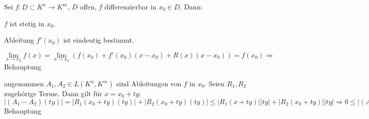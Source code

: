 	\begin{satz}\label{satz:eindeutig_x}
		Sei $f:D\subset K^n \to K^m$, $D$ offen, $f$ differenzierbar in $x_0\in D$. Dann:
		\begin{compactitem}
			\item $f$ ist stetig in $x_0$.
			\item Ableitung $f'(x_0)$ ist eindeutig bestimmt.
		\end{compactitem}
	\end{satz}
	\begin{beweis}
		\begin{compactitem}
			\item $\lim\limits_{x\to x_0} f(x)=\lim\limits_{x\to x_0} (f(x_0)+f'(x_0)(x-x_0)+R(x)(x-x_0))=f(x_0)
			\Rightarrow$ Behauptung
			\item angenommen $A_1,A_2\in L(K^n,K^m)$ sind Ableitungen von $f$ in $x_0$. Seien $R_1,R_2$ 
			zugehörige Terme. Dann gilt für $x=x_0+ty$: $|(A_1-A_2)(ty)|=|R_1(x_0+ty)(ty)|+|R_2(x_0+ty)
			(ty)| \le |R_1(x+ty)||ty|+|R_2(x_0+ty)||ty|\Rightarrow 0\le |(A_1-A_2)(y)|\le (|R_1(x_0+ty)|+|R_2
			(x_0+ty)|)|y|\to 0\Rightarrow (A_1-A_2)(y)=0\Rightarrow A_1=A_2\Rightarrow$ Behauptung
		\end{compactitem}
	\end{beweis}

